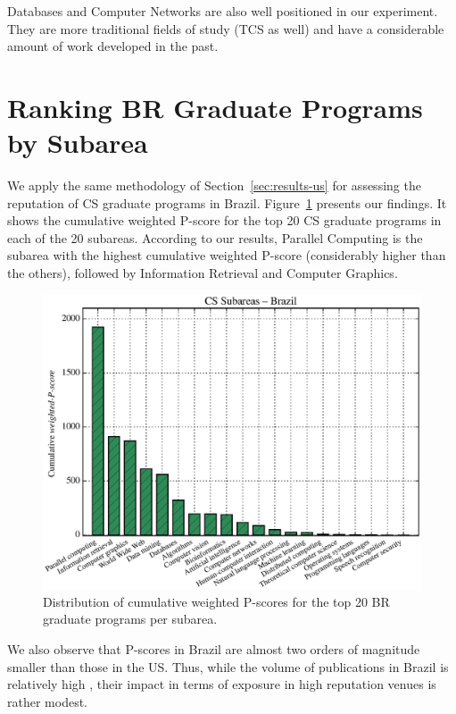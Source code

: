 \documentclass[msc]{ppgccufmg}
\begin{document}

Databases and Computer Networks are also well positioned in our experiment. They are more traditional fields of study (TCS as well) and have a considerable amount of work developed in the past. 

\section{Ranking BR Graduate Programs by Subarea}\label{sec:results-br}

We apply the same methodology of Section~\ref{sec:results-us} for assessing the reputation of CS graduate programs in Brazil. Figure~\ref{fig:br-research} presents our findings. It shows the cumulative weighted P-score for the top 20 CS graduate programs in each of the 20 subareas. According to our results, Parallel Computing is the subarea with the highest cumulative weighted P-score (considerably higher than the others), followed by Information Retrieval and Computer Graphics.

\begin{figure}[tb]
    \centering    
    \includegraphics[width=0.9\linewidth]{fig/char_br_research_new.eps}
    \caption{Distribution of cumulative weighted P-scores for the top 20 BR graduate programs per subarea.}
    \label{fig:br-research}
\end{figure}

We also observe that P-scores in Brazil are almost two orders of magnitude smaller than those in the US. Thus, while the volume of publications in Brazil is relatively high \citep{laender2008}, their impact in terms of exposure in high reputation venues is rather modest. 
\end{document}

